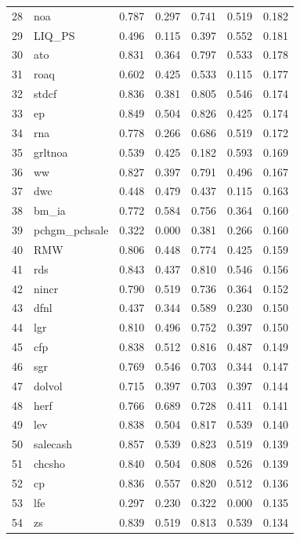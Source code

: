 \documentclass[12pt]{article}
\begin{document}
\begin{footnotesize}
\begin{longtable}{rl|c|c|c|c|c}
		28 & noa & 0.787 & 0.297 & 0.741 & 0.519 & 0.182 \\ 
		29 & LIQ\_PS & 0.496 & 0.115 & 0.397 & 0.552 & 0.181 \\ 
		30 & ato & 0.831 & 0.364 & 0.797 & 0.533 & 0.178 \\ 
		31 & roaq & 0.602 & 0.425 & 0.533 & 0.115 & 0.177 \\ 
		32 & stdcf & 0.836 & 0.381 & 0.805 & 0.546 & 0.174 \\ 
		33 & ep & 0.849 & 0.504 & 0.826 & 0.425 & 0.174 \\ 
		34 & rna & 0.778 & 0.266 & 0.686 & 0.519 & 0.172 \\ 
		35 & grltnoa & 0.539 & 0.425 & 0.182 & 0.593 & 0.169 \\ 
		36 & ww & 0.827 & 0.397 & 0.791 & 0.496 & 0.167 \\ 
		37 & dwc & 0.448 & 0.479 & 0.437 & 0.115 & 0.163 \\ 
		38 & bm\_ia & 0.772 & 0.584 & 0.756 & 0.364 & 0.160 \\ 
		39 & pchgm\_pchsale & 0.322 & 0.000 & 0.381 & 0.266 & 0.160 \\ 
		40 & RMW & 0.806 & 0.448 & 0.774 & 0.425 & 0.159 \\ 
		41 & rds & 0.843 & 0.437 & 0.810 & 0.546 & 0.156 \\ 
		42 & nincr & 0.790 & 0.519 & 0.736 & 0.364 & 0.152 \\ 
		43 & dfnl & 0.437 & 0.344 & 0.589 & 0.230 & 0.150 \\ 
		44 & lgr & 0.810 & 0.496 & 0.752 & 0.397 & 0.150 \\ 
		45 & cfp & 0.838 & 0.512 & 0.816 & 0.487 & 0.149 \\ 
		46 & sgr & 0.769 & 0.546 & 0.703 & 0.344 & 0.147 \\ 
		47 & dolvol & 0.715 & 0.397 & 0.703 & 0.397 & 0.144 \\ 
		48 & herf & 0.766 & 0.689 & 0.728 & 0.411 & 0.141 \\ 
		49 & lev & 0.838 & 0.504 & 0.817 & 0.539 & 0.140 \\ 
		50 & salecash & 0.857 & 0.539 & 0.823 & 0.519 & 0.139 \\ 
		51 & chcsho & 0.840 & 0.504 & 0.808 & 0.526 & 0.139 \\ 
		52 & cp & 0.836 & 0.557 & 0.820 & 0.512 & 0.136 \\ 
		53 & lfe & 0.297 & 0.230 & 0.322 & 0.000 & 0.135 \\ 
		54 & zs & 0.839 & 0.519 & 0.813 & 0.539 & 0.134 \\ 

\end{longtable}
\end{footnotesize}
\end{document}
